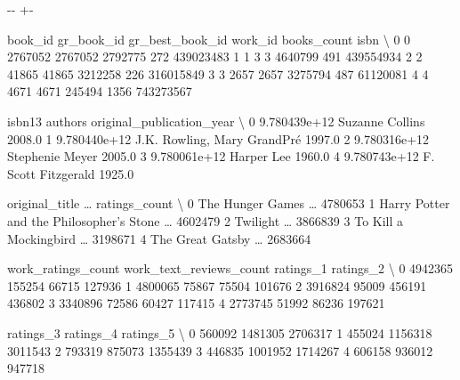 \documentclass[letterpaper,10pt,english]{sphinxmanual}
\newlength\nbsphinxcodecellspacing
\begin{document}
{

\kern-\sphinxverbatimsmallskipamount\kern-\baselineskip
\kern+\FrameHeightAdjust\kern-\fboxrule
\vspace{\nbsphinxcodecellspacing}

\begin{sphinxVerbatim}[commandchars=\\\{\}]
\llap{\color{nbsphinxout}[8]:\,\hspace{\fboxrule}\hspace{\fboxsep}}   book\_id  gr\_book\_id  gr\_best\_book\_id  work\_id  books\_count       isbn  \textbackslash{}
0        0     2767052          2767052  2792775          272  439023483
1        1           3                3  4640799          491  439554934
2        2       41865            41865  3212258          226  316015849
3        3        2657             2657  3275794          487   61120081
4        4        4671             4671   245494         1356  743273567

         isbn13                      authors  original\_publication\_year  \textbackslash{}
0  9.780439e+12              Suzanne Collins                     2008.0
1  9.780440e+12  J.K. Rowling, Mary GrandPré                     1997.0
2  9.780316e+12              Stephenie Meyer                     2005.0
3  9.780061e+12                   Harper Lee                     1960.0
4  9.780743e+12          F. Scott Fitzgerald                     1925.0

                             original\_title  {\ldots} ratings\_count  \textbackslash{}
0                          The Hunger Games  {\ldots}       4780653
1  Harry Potter and the Philosopher's Stone  {\ldots}       4602479
2                                  Twilight  {\ldots}       3866839
3                     To Kill a Mockingbird  {\ldots}       3198671
4                          The Great Gatsby  {\ldots}       2683664

  work\_ratings\_count  work\_text\_reviews\_count  ratings\_1  ratings\_2  \textbackslash{}
0            4942365                   155254      66715     127936
1            4800065                    75867      75504     101676
2            3916824                    95009     456191     436802
3            3340896                    72586      60427     117415
4            2773745                    51992      86236     197621

   ratings\_3  ratings\_4  ratings\_5  \textbackslash{}
0     560092    1481305    2706317
1     455024    1156318    3011543
2     793319     875073    1355439
3     446835    1001952    1714267
4     606158     936012     947718


\end{sphinxVerbatim}}
\end{document}
